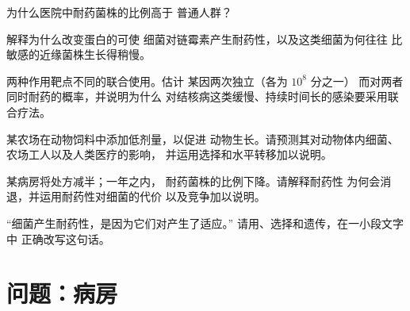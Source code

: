 \begin{exercise}[$\star\star$]\label{exo:g11:antibiotic-resistance:10}
为什么医院中耐药菌株的比例高于
普通人群？
\end{exercise}

\begin{exercise}[$\star\star$]\label{exo:g11:antibiotic-resistance:11}
解释为什么改变蛋白的可使
细菌对链霉素产生耐药性，以及这类细菌为何往往
比敏感的近缘菌株生长得稍慢。
\end{exercise}

\begin{exercise}[$\star\star\star$]\label{exo:g11:antibiotic-resistance:12}
两种作用靶点不同的联合使用。估计
某因两次独立（各为 $10^8$ 分之一）
而对两者同时耐药的概率，并说明为什么
对结核病这类缓慢、持续时间长的感染要采用联合疗法。
\end{exercise}

\begin{exercise}[$\star\star\star$]\label{exo:g11:antibiotic-resistance:13}
某农场在动物饲料中添加低剂量，以促进
动物生长。请预测其对动物体内细菌、
农场工人以及人类医疗的影响，
并运用选择和水平转移加以说明。
\end{exercise}

\begin{exercise}[$\star\star\star$]\label{exo:g11:antibiotic-resistance:14}
某病房将处方减半；一年之内，
耐药菌株的比例下降。请解释耐药性
为何会消退，并运用耐药性对细菌的代价
以及竞争加以说明。
\end{exercise}

\begin{exercise}[$\star\star\star$]\label{exo:g11:antibiotic-resistance:15}
“细菌产生耐药性，是因为它们对产生了适应。”
请用、选择和遗传，在一小段文字中
正确改写这句话。
\end{exercise}

\section{问题：病房}

